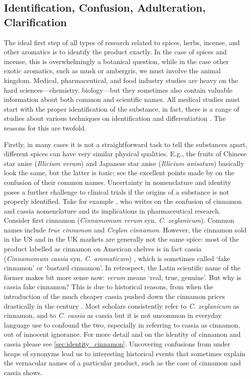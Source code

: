 \subsection{Identification, Confusion, Adulteration, Clarification}

The ideal first step of all types of research related to spices, herbs, incense, and other aromatics is to identify the product exactly. In the case of spices and incense, this is overwhelmingly a botanical question, while in the case other exotic aromatics, such as musk or ambergris, we must involve the animal kingdom. Medical, pharmaceutical, and food industry studies are heavy on the hard sciences---chemistry, biology---but they sometimes also contain valuable information about both common and scientific names. All medical studies must start with the proper identification of the substance, in fact, there is a range of studies about various techniques on identification and differentiation \autocite[cf.][]{ford_cinnamon_2019}. The reasons for this are twofold. 

Firstly, in many cases it is not a straightforward task to tell the substances apart, different spices can have very similar physical qualities. E.g., the fruits of Chinese star anise (\textit{Illicium verum}) and Japanese star anise (\textit{Illicium anisatum}) basically look the same, but the latter is toxic; see the excellent points made by \textcite{small_confusion_1996} on the confusion of their common names. Uncertainty in nomenclature and identity poses a further challenge to clinical trials if the origins of a substance is not properly identified. Take for example \textcite{oketch-rabah_cinnamon_2018}, who writes on the confusion of cinnamon and cassia nomenclature and its implications in pharmaceutical research. Consider first cinnamon (\textit{Cinnamomum verum} syn. \textit{C. zeylanicum}). Common names include \textit{true cinnamon} and \textit{Ceylon cinnamon}. However, the cinnamon sold in the US and in the UK markets are generally not the same spice: most of the product labelled as cinnamon on American shelves is in fact cassia (\textit{Cinnamomum cassia} syn. \textit{C. aromaticum}) \autocite{oketch-rabah_cinnamon_2018}, which is sometimes called `fake cinnamon' or `bastard cinnamon'. In retrospect, the Latin scientific name of the former makes bit more sense now: \textit{verum} means `real, true, genuine'. But why is cassia fake cinnamon? This is due to historical reasons, from when the introduction of the much cheaper cassia pushed down the cinnamon prices drastically in the  century \autocite{wijesekera_chemistry_1978}. Most scholars consistently refer to \textit{C. zeylanicum} as cinnamon, and to \textit{C. cassia} as cassia but it is not uncommon in everyday language use to confound the two, especially in referring to cassia as cinnamon, out of innocent ignorance. For more detail and on the identity of cinnamon and cassia please see \cref{sec:identity_cinnamon}. Uncovering confusions from under heaps of synonyms lead us to interesting historical events that sometimes explain the vernacular names of a particular product, such as the case of cinnamon and cassia shows. 

